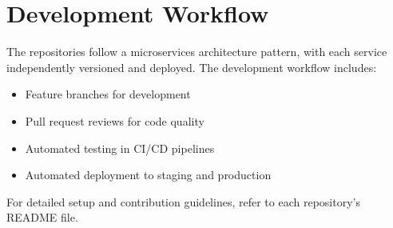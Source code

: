 \documentclass[12pt, a4paper]{report}
\begin{document}
\section{Development Workflow}
The repositories follow a microservices architecture pattern, with each service independently versioned and deployed. The development workflow includes:
\begin{itemize}
    \item Feature branches for development
    \item Pull request reviews for code quality
    \item Automated testing in CI/CD pipelines
    \item Automated deployment to staging and production
\end{itemize}

For detailed setup and contribution guidelines, refer to each repository's README file.


\renewcommand{\bibname}{References}


\end{document}
